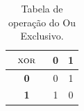 \begin{table}[!htb]
    \centering
    \caption{Tabela de operação do Ou Exclusivo.
        \label{tab:tabela-xor}}
    \begin{tabular}{c|c|c}
        \textbf{\(\ \textsc{ xor }\ \)} & \textbf{0} & \textbf{1} \\
        \hline
        \textbf{0}        & 0          & 1          \\
        \hline
        \textbf{1}        & 1          & 0          \\
    \end{tabular}
\end{table}